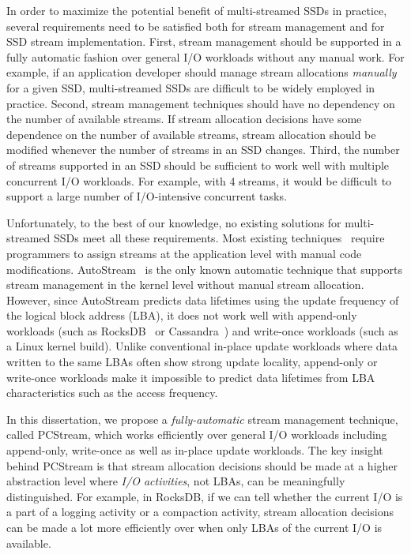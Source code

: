 In order to maximize the potential benefit of multi-streamed SSDs in practice,
several requirements need to be satisfied both for stream management and for
SSD stream implementation.  First, stream management should be supported in a
fully automatic fashion over general I/O workloads without any manual work.
For example, if an application developer should manage stream allocations {\it
manually} for a given SSD, multi-streamed SSDs are difficult to be widely
employed in practice.   Second, stream management techniques should have no
dependency on the number of available streams.  If stream allocation decisions
have some dependence on the number of available streams,  stream allocation
should be modified whenever the number of streams in an SSD changes.  Third,
the number of streams supported in an SSD should be sufficient to work well
with multiple concurrent I/O workloads.  For example, with 4 streams, it would
be difficult to support a large number of I/O-intensive concurrent tasks.  

Unfortunately, to the best of our knowledge, no existing solutions  for
multi-streamed SSDs meet all these requirements.  Most existing
techniques~\cite{MultiStream, Level, vStream, FStream} require programmers to
assign streams at the application level with manual code modifications.
\textsf{\small AutoStream}~\cite{AutoStream} is the only known automatic
technique that supports stream management in the kernel level without manual
stream allocation.  However, since \textsf{\small AutoStream} predicts data
lifetimes using the update frequency of the logical block address (LBA), it
does not work well with append-only workloads (such as
RocksDB~\cite{RocksDB} or Cassandra~\cite{Cassandra})
and write-once workloads (such as a Linux kernel build).  Unlike conventional
in-place update workloads where data written to the same LBAs often show strong update
locality, append-only or write-once workloads make it impossible to predict data lifetimes
from LBA characteristics such as the access frequency.

In this dissertation, we propose a {\it fully-automatic} stream management technique,
called \textsf{\small PCStream}, which works efficiently over general I/O
workloads including append-only, write-once as well as in-place update workloads.   
The key insight behind
\textsf{\small PCStream} is that stream allocation decisions should be made at
a higher abstraction level where {\it I/O activities}, not LBAs, can be
meaningfully distinguished.  For example, in RocksDB, if we can tell whether
the current I/O is a part of a logging activity or a compaction activity, stream
allocation decisions can be made a lot more efficiently over when only LBAs of
the current I/O is available.   

